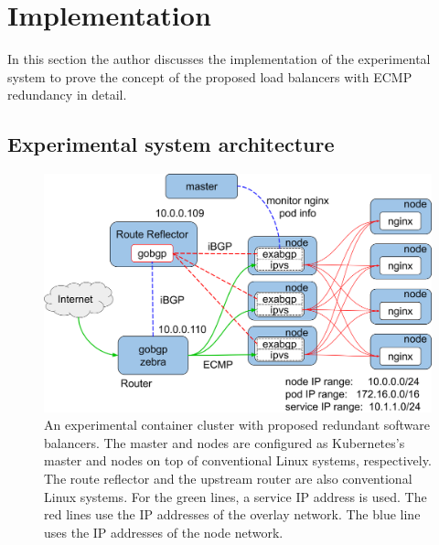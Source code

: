 \section{Implementation}

In this section the author discusses the implementation of the experimental system to prove the concept of the proposed load balancers with ECMP redundancy in detail.

\subsection{Experimental system architecture}\label{sec:poc}

\begin{figure}[tb]
\centering
\includegraphics[width=0.8\columnwidth]{Figs/poc.png}

\par\bigskip
\centering
\begin{minipage}{0.9\columnwidth}
  \caption[Container cluster with proposed redundant software balancers]{
    An experimental container cluster with proposed redundant software balancers.
    The master and nodes are configured as Kubernetes's master and nodes on top of conventional Linux systems, respectively.
    The route reflector and the upstream router are also conventional Linux systems.
    For the green lines, a service IP address is used. The red lines use the IP addresses of the overlay network. The blue line uses the IP addresses of the node network.
  }
  \label{fig:poc}
\end{minipage}

\end{figure}

